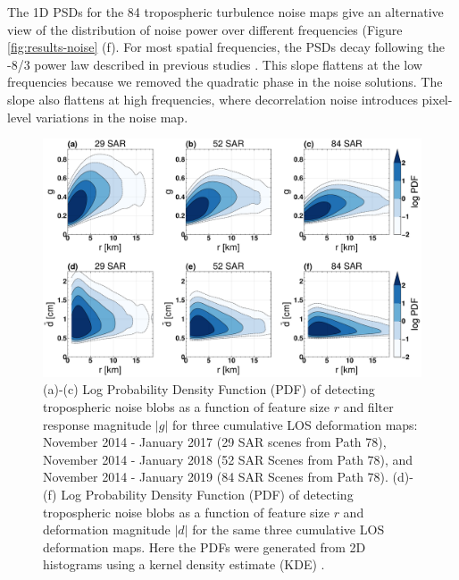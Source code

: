 The 1D PSDs for the 84 tropospheric turbulence noise maps give an alternative view of the distribution of noise power over different frequencies (Figure \ref{fig:results-noise} (f). For most spatial frequencies, the PSDs decay following the -8/3 power law described in previous studies \citep{Hanssen2001RadarInterferometryData, Onn2006ModelingWaterVapor}. This slope flattens at the low frequencies because we removed the quadratic phase in the noise solutions. The slope also flattens at high frequencies, where decorrelation noise introduces pixel-level variations in the noise map.



\begin{figure}
	\centering 
	\includegraphics[width=0.98\linewidth]{paper2/figures/figure_results_kde.pdf}
	\caption[Estimates of empirical tropospheric noise probability density]{ (a)-(c) Log Probability Density Function (PDF) of detecting tropospheric noise blobs as a function of feature size $r$ and filter response magnitude $|g|$ for three cumulative LOS deformation maps: November 2014 - January 2017 (29 SAR scenes from Path 78), November 2014 - January 2018 (52 SAR Scenes from Path 78), and November 2014 - January 2019 (84 SAR Scenes from Path 78).
		(d)-(f) Log Probability Density Function (PDF) of detecting tropospheric noise blobs as a function of feature size $r$ and deformation magnitude $|d|$ for the same three cumulative LOS deformation maps.
		Here the PDFs were generated from 2D histograms using a kernel density estimate (KDE) \citep{Scott2015MultivariateDensityEstimation}.
	}
	\label{fig:results-kde}
\end{figure}



